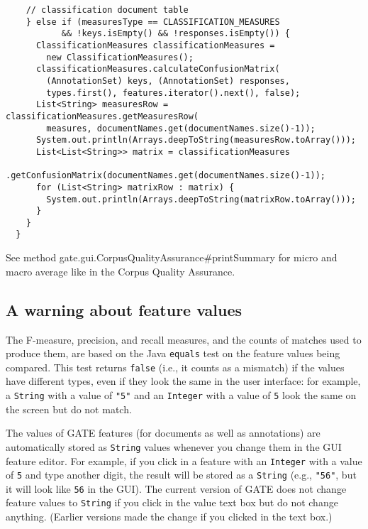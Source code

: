 \begin{lstlisting}
    // classification document table
    } else if (measuresType == CLASSIFICATION_MEASURES
           && !keys.isEmpty() && !responses.isEmpty()) {
      ClassificationMeasures classificationMeasures =
        new ClassificationMeasures();
      classificationMeasures.calculateConfusionMatrix(
        (AnnotationSet) keys, (AnnotationSet) responses,
        types.first(), features.iterator().next(), false);
      List<String> measuresRow = classificationMeasures.getMeasuresRow(
        measures, documentNames.get(documentNames.size()-1));
      System.out.println(Arrays.deepToString(measuresRow.toArray()));
      List<List<String>> matrix = classificationMeasures
        .getConfusionMatrix(documentNames.get(documentNames.size()-1));
      for (List<String> matrixRow : matrix) {
        System.out.println(Arrays.deepToString(matrixRow.toArray()));
      }
    }
  }
\end{lstlisting}

See method
{gate.gui.CorpusQualityAssurance\#printSummary} for micro and macro average
like in the Corpus Quality Assurance.

\subsection[sec:eval:qawarning]{A warning about feature values}
%
The F-measure, precision, and recall measures, and the counts of matches used to
produce them, are based on the Java \texttt{equals} test on the feature values
being compared.  This test returns \texttt{false} (i.e., it counts as a
mismatch) if the values have different types, even if they look the same in the
user interface: for example, a \texttt{String} with a value of \texttt{"5"} and
an \texttt{Integer} with a value of \texttt{5} look the same on the screen but
do not match.

The values of GATE features (for documents as well as annotations) are
automatically stored as \texttt{String} values whenever you change them in the
GUI feature editor.  For example, if you click in a feature with an
\texttt{Integer} with a value of \texttt{5} and type another digit, the result
will be stored as a \texttt{String} (e.g., \texttt{"56"}, but it will look like
\texttt{56} in the GUI).  The current version of GATE does not change feature
values to \texttt{String} if you click in the value text box but do not change
anything.  (Earlier versions made the change if you clicked in the text box.)

